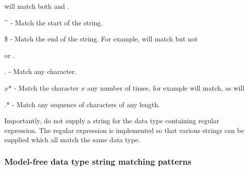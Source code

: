  will match both 
 and 
.

    \^{} - Match the start of the string.

    \$ - Match the end of the string.  For example, 
 will match 
 but not 

    or 
.

    . - Match any character.

    $x$* - Match the character $x$ any number of times, for example 
 will match, as will
    


    .* - Match any sequence of characters of any length.

Importantly, do not supply a string for the data type containing regular expression.  The
regular expression is implemented so that various strings can be supplied which all match
the same data type.


\subsubsection{Model-free data type string matching patterns}



